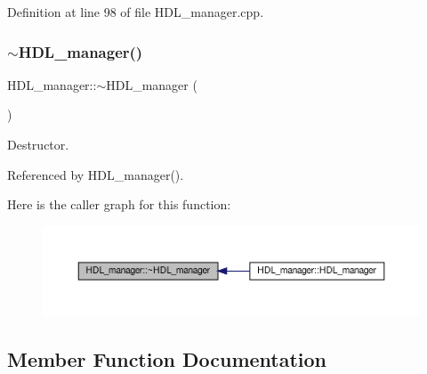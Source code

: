 Definition at line 98 of file H\+D\+L\+\_\+manager.\+cpp.

\mbox{\label{classHDL__manager_a4ee4c8c0fa6151e95741b6adc10b58f1}} 
\subsubsection{\texorpdfstring{$\sim$\+H\+D\+L\+\_\+manager()}{~HDL\_manager()}}
{\footnotesize\ttfamily H\+D\+L\+\_\+manager\+::$\sim$\+H\+D\+L\+\_\+manager (\begin{DoxyParamCaption}{ }\end{DoxyParamCaption})\hspace{0.3cm}{\ttfamily [default]}}



Destructor. 



Referenced by H\+D\+L\+\_\+manager().

Here is the caller graph for this function\+:
\nopagebreak
\begin{figure}[H]
\begin{center}
\leavevmode
\includegraphics[width=350pt]{d7/d32/classHDL__manager_a4ee4c8c0fa6151e95741b6adc10b58f1_icgraph}
\end{center}
\end{figure}


\subsection{Member Function Documentation}
\mbox{\label{classHDL__manager_a4e2cbf9a5efaf0260a29e64ec3906500}} 
